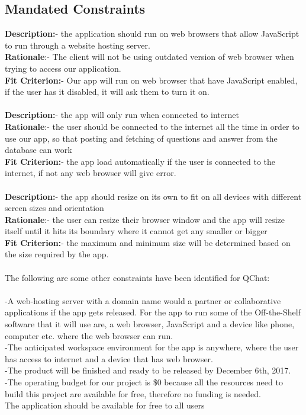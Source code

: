 \documentclass[12pt, titlepage]{article}
\begin{document}
\subsection{Mandated Constraints}
\textbf{Description:}- the application should run on web browsers that allow JavaScript to run through a website hosting server.
\\ 
\textbf{Rationale}:- The client will not be using outdated version of web browser when trying to access our application. \\ 
\textbf{Fit Criterion:}- Our app will run on web browser that have JavaScript enabled, if the user has it disabled, it will ask them to turn it on.\\
\\
\textbf{Description:}- the app will only run when connected to internet\\ 
\textbf{Rationale}:- the user should be connected to the internet all the time in order to use our app, so that posting and fetching of questions and answer from the database can work\\ \textbf{Fit Criterion:}- the app load automatically if the user is connected to the internet, if not any web browser will give error. \\
\\
\textbf{Description:}- the app should resize on its own to fit on all devices with different screen sizes and orientation \\ \textbf{Rationale}:- the user can resize their browser window and the app will resize itself until it hits its boundary where it cannot get any smaller or bigger\\ 
\textbf{Fit Criterion:}- the maximum and minimum size will be determined based on the size required by the app. \\
\\
The following are some other constraints have been identified for QChat: \\
\\
-A web-hosting server with a domain name would a partner or collaborative applications if the app gets released. 
For the app to run some of the Off-the-Shelf software that it will use are, a web browser, JavaScript and a device like phone, computer etc. where the web browser can run. \\
-The anticipated workspace environment for the app is anywhere, where the user has access to internet and a device that has web browser. \\
-The product will be finished and ready to be released by December 6th, 2017. \\
-The operating budget for our project is \$0 because all the resources need to build this project are available for free, therefore no funding is needed. \\
The application should be available for free to all users
\end{document}

